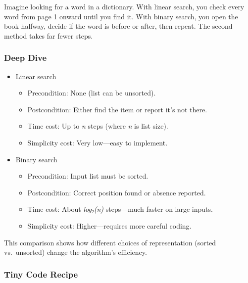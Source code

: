 \documentclass[
  letterpaper,
  DIV=11,
  numbers=noendperiod]{scrreprt}
\providecommand{\tightlist}{%
  \setlength{\itemsep}{0pt}\setlength{\parskip}{0pt}}
\begin{document}
Imagine looking for a word in a dictionary. With linear search, you
check every word from page 1 onward until you find it. With binary
search, you open the book halfway, decide if the word is before or
after, then repeat. The second method takes far fewer steps.

\subsubsection{Deep Dive}\label{deep-dive-48}

\begin{itemize}
\item
  Linear search

  \begin{itemize}
  \tightlist
  \item
    Precondition: None (list can be unsorted).
  \item
    Postcondition: Either find the item or report it's not there.
  \item
    Time cost: Up to \emph{n} steps (where \emph{n} is list size).
  \item
    Simplicity cost: Very low---easy to implement.
  \end{itemize}
\item
  Binary search

  \begin{itemize}
  \tightlist
  \item
    Precondition: Input list must be sorted.
  \item
    Postcondition: Correct position found or absence reported.
  \item
    Time cost: About \emph{log₂(n)} steps---much faster on large inputs.
  \item
    Simplicity cost: Higher---requires more careful coding.
  \end{itemize}
\end{itemize}

This comparison shows how different choices of representation (sorted
vs.~unsorted) change the algorithm's efficiency.

\subsubsection{Tiny Code Recipe}\label{tiny-code-recipe-76}
\end{document}
